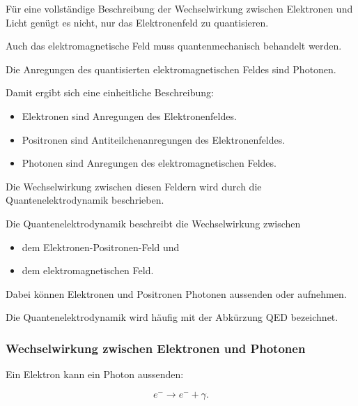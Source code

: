 Für eine vollständige Beschreibung der Wechselwirkung zwischen
Elektronen und Licht genügt es nicht, nur das Elektronenfeld zu
quantisieren.

Auch das elektromagnetische Feld%
muss quantenmechanisch behandelt werden.

Die Anregungen des quantisierten elektromagnetischen Feldes sind
Photonen.

Damit ergibt sich eine einheitliche Beschreibung:

\begin{itemize}
	\item Elektronen sind Anregungen des Elektronenfeldes.
	\item Positronen sind Antiteilchenanregungen des Elektronenfeldes.
	\item Photonen sind Anregungen des elektromagnetischen Feldes.
\end{itemize}

Die Wechselwirkung zwischen diesen Feldern wird durch die
Quantenelektrodynamik%
 beschrieben.

\begin{PhysicsBox}
	\label{box:grundidee_quantenelektrodynamik}
	
	Die Quantenelektrodynamik beschreibt die Wechselwirkung zwischen
	
	\begin{itemize}
		\item dem Elektronen-Positronen-Feld und
		\item dem elektromagnetischen Feld.
	\end{itemize}
	
	Dabei können Elektronen und Positronen Photonen aussenden oder
	aufnehmen.
	
	Die Quantenelektrodynamik wird häufig mit der Abkürzung QED bezeichnet.
\end{PhysicsBox}

\subsubsection*{Wechselwirkung zwischen Elektronen und Photonen}

Ein Elektron kann ein Photon aussenden:

\begin{equation}
	e^-
	\longrightarrow
	e^-
	+
	\gamma.
	\label{eq:elektron_emission_photon_symbolisch}
\end{equation}

